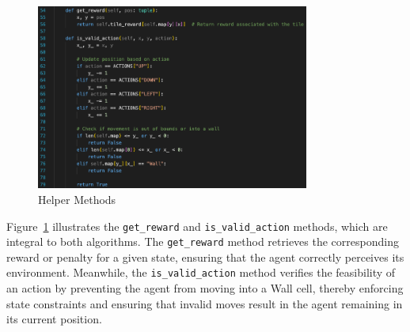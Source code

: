 \begin{figure}[H]
    \centering
    \includegraphics[width=0.8\textwidth]{images/helper_func.png}
    \caption{Helper Methods}
    \label{fig:helper}
\end{figure}

Figure~\ref{fig:helper} illustrates the \texttt{get\_reward} and \texttt{is\_valid\_action} methods, which are integral to both algorithms. The \texttt{get\_reward} method retrieves the corresponding reward or penalty for a given state, ensuring that the agent correctly perceives its environment. Meanwhile, the \texttt{is\_valid\_action} method verifies the feasibility of an action by preventing the agent from moving into a Wall cell, thereby enforcing state constraints and ensuring that invalid moves result in the agent remaining in its current position.
